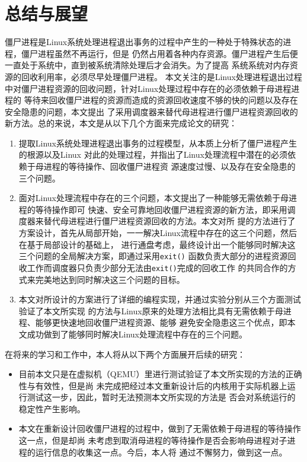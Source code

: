 \documentclass{swfuthesism}
\begin{document}
\chapter{总结与展望}
僵尸进程是Linux系统处理进程退出事务的过程中产生的一种处于特殊状态的进程，僵尸进程虽然不再运行，但是
仍然占用着各种内存资源。僵尸进程产生后便一直处于系统中，直到被系统清除处理后才会消失。为了提高
系统系统对内存资源的回收利用率，必须尽早处理僵尸进程。
本文关注的是Linux处理进程退出过程中对僵尸进程资源的回收问题，针对Linux处理过程中存在的必须依赖于母进程进程的
等待来回收僵尸进程的资源而造成的资源回收速度不够的快的问题以及存在安全隐患的问题，本文提出
了采用调度器来替代母进程进行僵尸进程资源回收的新方法。总的来说，本文是从以下几个方面来完成论文的研究：
\begin{enumerate}
\item 提取Linux系统处理进程退出事务的过程模型，从本质上分析了僵尸进程产生的根源以及Linux
  对此的处理过程，并指出了Linux处理流程中潜在的必须依赖于母进程的等待操作、回收僵尸进程资
  源速度过慢、以及存在安全隐患的三个问题。
\item 面对Linux处理流程中存在的三个问题，本文提出了一种能够无需依赖于母进程的等待操作即可
  快速、安全可靠地回收僵尸进程资源的新方法，即采用调度器来替代母进程进行僵尸进程资源回收的方法。本文对所
  提的方法进行了方案设计，首先从局部开始，一一解决Linux流程中存在的这三个问题，然后在基于局部设计的基础上，
  进行通盘考虑，最终设计出一个能够同时解决这三个问题的全局解决方案，即通过采用\texttt{exit()}
  函数负责大部分的进程资源回收工作而调度器只负责少部分无法由\texttt{exit()}完成的回收工作
  的共同合作的方式来完美地达到同时解决这三个问题的目标。
\item 本文对所设计的方案进行了详细的编程实现，并通过实验分别从三个方面测试验证了本文所实现
  的方法与Linux原来的处理方法相比具有无需依赖于母进程、能够更快速地回收僵尸进程资源、能够
  避免安全隐患这三个优点，即本文成功做到了能够同时解决Linux处理流程中存在的三个问题。
\end{enumerate}

在将来的学习和工作中，本人将从以下两个方面展开后续的研究：
\begin{itemize}
  \item 目前本文只是在虚拟机（QEMU）里进行测试验证了本文所实现的方法的正确性与有效性，但是尚
  未完成把经过本文重新设计后的内核用于实际机器上运行测试这一步，因此，暂时无法预测本文所实现的方法是
  否会对系统运行的稳定性产生影响。
\item 本文在重新设计回收僵尸进程的过程中，做到了无需依赖于母进程的等待操作这一点，但是却尚
  未考虑到取消母进程的等待操作是否会影响母进程对子进程的运行信息的收集这一点。今后，本人将
  通过不懈努力，做到这一点。 
\end{itemize}
\end{document}
